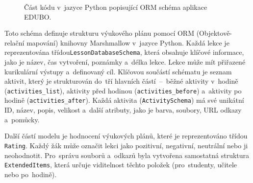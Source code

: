 \documentclass[male,czech,api_bc]{kitheses}
\begin{document}
\begin{figure}[H]
	\centering
	\caption{Část kódu v~jazyce Python popisující ORM schéma aplikace EDUBO.}
	\label{fig:code-1}
\end{figure}

Toto schéma definuje strukturu výukového plánu pomocí ORM (Objektově-relační mapování) knihovny Marshmallow v~jazyce Python. Každá lekce je reprezentována třídou\break\texttt{LessonDatabaseSchema}, která obsahuje klíčové informace, jako je název, čas vytvoření, poznámky a~délka lekce. Lekce může mít přiřazené kurikulární výstupy a~definovaný cíl. Klíčovou součástí schématu je seznam aktivit, který je strukturován do~tří hlavních částí~--~běžné aktivity v~hodině (\texttt{activities\_list}), aktivity před hodinou (\texttt{activities\_before}) a~aktivity po hodině (\texttt{activities\_after}). Každá aktivita (\texttt{ActivitySchema}) má své unikátní ID, název, popis, velikost a~další atributy, jako je barva, soubory, URL odkazy a~pomůcky.

Další částí modelu je hodnocení výukových plánů, které je reprezentováno třídou \texttt{Rating}. Každý žák může označit lekci jako pozitivní, negativní, neutrální nebo ji neohodnotit. Pro~správu souborů a~odkazů byla vytvořena samostatná struktura \texttt{ExtendedItems}, která určuje viditelnost těchto položek (pro~studenty, učitele nebo po~hodině).
\end{document}
